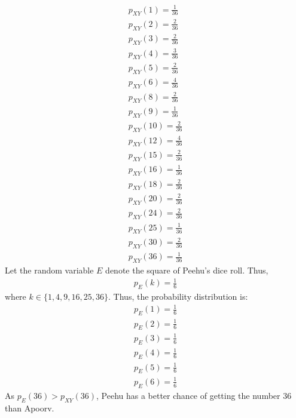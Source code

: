 \documentclass[journal,12pt,twocolumn]{IEEEtran}
\theoremstyle{remark}
\begin{document}
\begin{align}
p_{XY}(1) = \frac{1}{36}\\
p_{XY}(2) = \frac{2}{36}\\
p_{XY}(3) = \frac{2}{36}\\
p_{XY}(4) = \frac{3}{36}\\
p_{XY}(5) = \frac{2}{36}\\
p_{XY}(6) = \frac{4}{36}\\
p_{XY}(8) = \frac{2}{36}\\
p_{XY}(9) = \frac{1}{36}\\
p_{XY}(10) = \frac{2}{36}\\
p_{XY}(12) = \frac{4}{36}\\
p_{XY}(15) = \frac{2}{36}\\
p_{XY}(16) = \frac{1}{36}\\
p_{XY}(18) = \frac{2}{36}\\
p_{XY}(20) = \frac{2}{36}\\
p_{XY}(24) = \frac{2}{36}\\
p_{XY}(25) = \frac{1}{36}\\
p_{XY}(30) = \frac{2}{36}\\
p_{XY}(36) = \frac{1}{36}
\end{align}
Let the random variable $E$ denote the square of Peehu's dice roll. Thus,
\begin{align}
p_E(k) = \frac{1}{6} 
\end{align}
where $k \in \{1, 4, 9, 16, 25, 36\}$. Thus, the probability distribution is:
\begin{align}
p_{E}(1) = \frac{1}{6}\\
p_{E}(2) = \frac{1}{6}\\
p_{E}(3) = \frac{1}{6}\\
p_{E}(4) = \frac{1}{6}\\
p_{E}(5) = \frac{1}{6}\\
p_{E}(6) = \frac{1}{6}
\end{align}
As $p_{E}(36) > p_{XY}(36)$, Peehu has a better chance of getting the number 36 than Apoorv.
\end{document}

